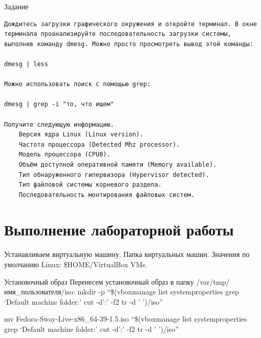 \documentclass[
  ignorenonframetext,
  aspectratio=169,
  russian,
]{beamer}
\begin{document}
\begin{frame}[fragile]{Задание}
\begin{verbatim}
Дождитесь загрузки графического окружения и откройте терминал. В окне терминала проанализируйте последовательность загрузки системы, выполнив команду dmesg. Можно просто просмотреть вывод этой команды:

dmesg | less

Можно использовать поиск с помощью grep:

dmesg | grep -i "то, что ищем"

Получите следующую информацию.
    Версия ядра Linux (Linux version).
    Частота процессора (Detected Mhz processor).
    Модель процессора (CPU0).
    Объём доступной оперативной памяти (Memory available).
    Тип обнаруженного гипервизора (Hypervisor detected).
    Тип файловой системы корневого раздела.
    Последовательность монтирования файловых систем.
\end{verbatim}
\end{frame}

\section{Выполнение лабораторной
работы}\label{ux432ux44bux43fux43eux43bux43dux435ux43dux438ux435-ux43bux430ux431ux43eux440ux430ux442ux43eux440ux43dux43eux439-ux440ux430ux431ux43eux442ux44b}

\begin{frame}{Устанавливаем виртуальную машину.}
\label{ux443ux441ux442ux430ux43dux430ux432ux43bux438ux432ux430ux435ux43c-ux432ux438ux440ux442ux443ux430ux43bux44cux43dux443ux44e-ux43cux430ux448ux438ux43dux443.}
Папка виртуальных машин. Значения по умолчанию Linux: \$HOME/VirtualBox
VMs.
\end{frame}

\begin{frame}{Установочный образ}
\label{ux443ux441ux442ux430ux43dux43eux432ux43eux447ux43dux44bux439-ux43eux431ux440ux430ux437}
Перенесем установочный образ в папку /var/tmp/имя\_пользователя/iso:
mkdir -p \enquote{\$(vboxmanage list systemproperties \textbar{} grep
\enquote*{Default machine folder:} \textbar{} cut -d':' -f2 \textbar{}
tr -d ' ')/iso}

mv Fedora-Sway-Live-x86\_64-39-1.5.iso \enquote{\$(vboxmanage list
systemproperties \textbar{} grep \enquote*{Default machine folder:}
\textbar{} cut -d':' -f2 \textbar{} tr -d ' ')/iso}
\end{frame}
\end{document}
